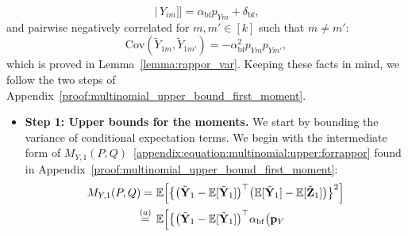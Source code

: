\documentclass[twoside,11pt]{article}
\newcommand{\rvTwo}{Y}
\newcommand{\rvThree}{Z}
\newcommand{\vectorize}[1]{\mathbf{#1}}
\newcommand{\mE}{\mathbb{E}} %
\newcommand{\sampleIndexOne}{i}
\newcommand{\alphabetSize}{k} %
\newcommand{\vectorIndex}{m}
\newcommand{\probVecElement}[2]{p_{{#1}{#2}}}
\newcommand{\probVec}{\mathbf{p}} %
\newcommand{\kernelMoment}{M} %
\newcommand{\dataGenDist}{P}  %
\newcommand{\privacyMechanism}{Q}
\newcommand{\privacyParameter}{\alpha} %
\newcommand{\privacyParameterrappor}{\privacyParameter_{\mathrm{bf}}}
\newcommand{\smallNumber}{\delta}
\newcommand{\smallNumberrappor}{\smallNumber_{\mathrm{bf}}}
\newcommand{\momentTwosampleVarCondexpY}{\kernelMoment_{\rvTwo,1}(\dataGenDist, \privacyMechanism)}
\newcommand{\ilmun}[1]{
	{ \color{blue} Ilmun: #1}
}
\begin{document}
\begin{appendix}
\begin{equation}
		\,\big|\, %
		\rvTwo_{\sampleIndexOne \vectorIndex}] 
		\bigr]
		=
		\privacyParameterrappor 
		\probVecElement{\rvTwo}{\vectorIndex}
		+ \smallNumberrappor,	
	\end{equation}
	and pairwise negatively correlated for $m, m' \in [k]$ such that $m \neq m'$:
	\begin{equation}\label{cov_neg}
		\mathrm{Cov}(\tilde{Y}_{1\vectorIndex}, \tilde{Y}_{1\vectorIndex'})
		=
		-
		\privacyParameterrappor^2
		\probVecElement{\rvTwo}{\vectorIndex}
		\probVecElement{\rvTwo}{\vectorIndex'},
	\end{equation}
	\noindent
	which is proved in Lemma~\ref{lemma:rappor_var}.
	Keeping these facts in mind, we follow the two steps of Appendix~\ref{proof:multinomial_upper_bound_first_moment}.
	
	\begin{itemize}
	\item \textbf{Step 1: Upper bounds for the moments.}
	We start by bounding the variance of conditional expectation terms. We begin with the intermediate form of $\momentTwosampleVarCondexpY$~\eqref{appendix:equation:multinomial:upper:forrappor} found in Appendix~\ref{proof:multinomial_upper_bound_first_moment}:
	\begin{align*}
		\momentTwosampleVarCondexpY
		= ~ &
		\mE %
		\Bigl[ %
		\bigl\{ %
		\bigl( %
		\tilde{\vectorize{\rvTwo}}_1
		- %
		\mE [ \tilde{\vectorize{\rvTwo}}_{1}]
		\bigr)^\top %
		\bigl( %
		\mE [ \tilde{\vectorize{\rvTwo}}_{1}]
		- %
		\mE [ \tilde{\vectorize{\rvThree}}_{1}]
		\bigr) %
		\bigr\}^2 %
		\Bigr] %
		\\ \stackrel{(a)}{=} \hskip 1.57mm &
		\mE %
		\Bigl[ %
		\bigl\{ %
		\bigl( %
		\tilde{\vectorize{\rvTwo}}_1
		- %
		\mE [ \tilde{\vectorize{\rvTwo}}_{1}]
		\bigr)^\top %
		\privacyParameterrappor
		\bigl( %
		\probVec_{\rvTwo}

\end{align*}
\end{itemize}
\end{appendix}
\end{document}
